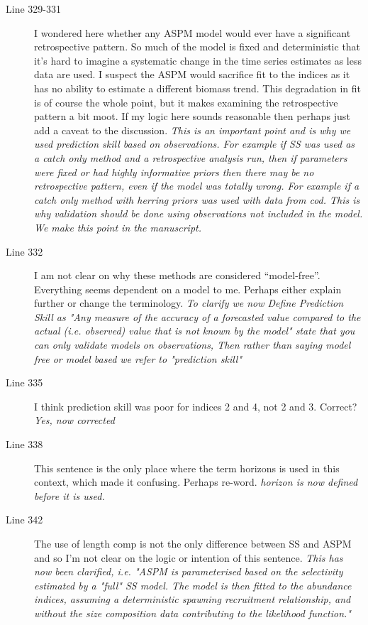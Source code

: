 \begin{itemize}
\begin{description}
\item[Line 329-331] I wondered here whether any ASPM model would ever have a significant retrospective pattern. So much of the model is fixed and deterministic that it’s hard to imagine a systematic change in the time series estimates as less data are used. I suspect the ASPM would sacrifice fit to the indices as it has no ability to estimate a different biomass trend. This degradation in fit is of course the whole point, but it makes examining the retrospective pattern a bit moot. If my logic here sounds reasonable then perhaps just add a caveat to the discussion.
\textit{\newline This is an important point and is why we used prediction skill based on observations. For example if SS was used as a catch only method \parencite[e.g. Simple SS][]{cope2013implementing} and a retrospective analysis run, then if parameters were fixed or had highly informative priors then there may be no retrospective pattern, even if the model was totally wrong. For example if a catch only method with herring priors was used with data from cod. This is why validation should be done using observations not included in the model. We make this point in the manuscript.}

\item[Line 332] I am not clear on why these methods are considered “model-free”. Everything seems dependent on a model to me. Perhaps either explain further or change the terminology. 
\textit{\newline To clarify we now Define Prediction Skill as "Any measure of the accuracy of a forecasted value compared to the actual (i.e. observed) value that is not known by the model" state that you can only validate models on observations, Then rather than saying model free or model based we refer to "prediction skill"}

\item[Line 335] I think prediction skill was poor for indices 2 and 4, not 2 and 3. Correct?
\textit{\newline Yes, now corrected}

\item[Line 338] This sentence is the only place where the term horizons is used in this context, which made it confusing. Perhaps re-word.
\textit{\newline horizon is now defined before it is used.}

\item[Line 342] The use of length comp is not the only difference between SS and ASPM and so I’m not clear on the logic or intention of this sentence.
\textit{\newline This has now been clarified, i.e. "ASPM is parameterised based on the selectivity estimated by a "full" SS model. The model is then fitted to the abundance indices, assuming a deterministic spawning recruitment relationship, and without the size composition data contributing to the likelihood function."}


\end{description}
\end{itemize}
